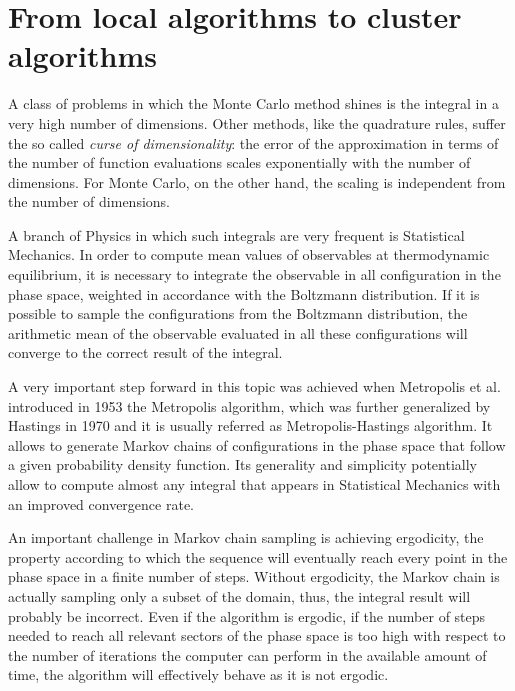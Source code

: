 \section*{From local algorithms to cluster algorithms}
A class of problems in which the Monte Carlo method shines is the integral in a very high number of dimensions.
Other methods, like the quadrature rules, suffer the so called \emph{curse of dimensionality}: the error of the approximation in terms of the number of function evaluations scales exponentially with the number of dimensions.
For Monte Carlo, on the other hand, the scaling is independent from the number of dimensions.

A branch of Physics in which such integrals are very frequent is Statistical Mechanics.
In order to compute mean values of observables at thermodynamic equilibrium,
it is necessary to integrate the observable in all configuration in the phase space, weighted in accordance with the Boltzmann distribution.
If it is possible to sample the configurations from the Boltzmann distribution,
the arithmetic mean of the observable evaluated in all these configurations will converge to the correct result of the integral.

A very important step forward in this topic was achieved when Metropolis et al. introduced in 1953 \cite{metropolis:1953} the Metropolis algorithm,
which was further generalized by Hastings in 1970 \cite{hastings:1970} and it is usually referred as Metropolis-Hastings algorithm.
It allows to generate Markov chains of configurations in the phase space that follow a given probability density function.
Its generality and simplicity potentially allow to compute almost any integral that appears in Statistical Mechanics with an improved convergence rate.

An important challenge in Markov chain sampling is achieving ergodicity,
\ie the property according to which the sequence will eventually reach every point in the phase space in a finite number of steps.
Without ergodicity, the Markov chain is actually sampling only a subset of the domain, thus, the integral result will probably be incorrect.
Even if the algorithm is ergodic, if the number of steps needed to reach all relevant sectors of the phase space is too high
with respect to the number of iterations the computer can perform in the available amount of time, the algorithm will effectively behave as it is not ergodic.

